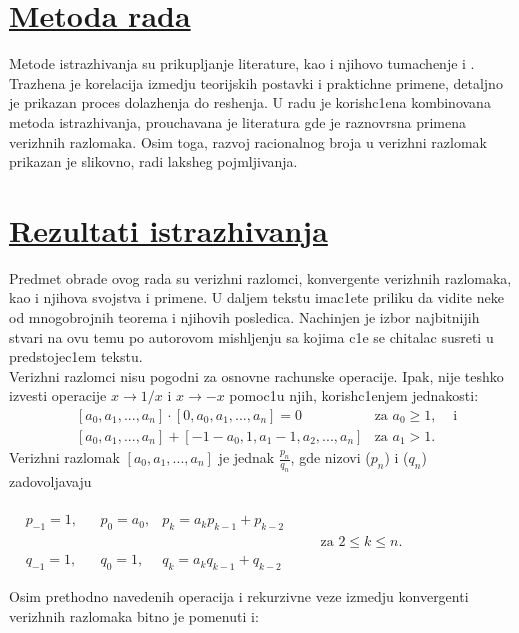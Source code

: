 \documentclass{article}
\begin{document}
\begin{multicols}{2}
\section*{\underline{Metoda rada}}
Metode istrazhivanja su \text prikupljanje literature, kao i njihovo tumachenje i .
Trazhena je \text korelacija izmedju teorijskih postavki i \text praktichne
primene, detaljno je prikazan \text proces dolazhenja do reshenja. U radu je
korish$ $c1ena kombinovana metoda \text istrazhivanja, prouchavana je
literatura gde je raznovrsna \text primena verizhnih razlomaka. Osim toga,  razvoj racionalnog broja u verizhni razlomak prikazan je  slikovno, radi laksheg pojmljivanja.
\noindent

\section*{\underline{Rezultati istrazhivanja}}
Predmet obrade ovog rada su verizhni razlomci, konvergente verizhnih razlomaka, kao i njihova \text svojstva i primene. U daljem tekstu imac1ete \text priliku da vidite neke od mnogobrojnih teorema i njihovih posledica. Nachinjen je izbor najbitnijih stvari na ovu temu po autorovom mishljenju sa \text kojima c1e se chitalac susreti u predstojec1em tekstu.\columnbreak\\
Verizhni razlomci nisu pogodni za osnovne rachunske operacije. Ipak, nije teshko izvesti \text operacije $x \to 1/x$ i $x \to -x$ pomoc1u njih, \text korish{}c1enjem jednakosti:
\begin{align*}
    &[a_0,a_1,...,a_n] \cdot [0,a_0,a_1,...,a_n]=0 &\text{za } a_0\geq 1,& \text{ i}\\
    &[a_0,a_1,...,a_n] + [-1-a_0,1,a_1-1,a_2,...,a_n] &\text{za } a_1>1.&
\end{align*}
Verizhni razlomak $[a_0, a_1, . . . , a_n]$ je jednak $\frac{p_n}{q_n}$, gde \text nizovi ($p_n$) i ($q_n$) zadovoljavaju
\begin{center}
$\begin{aligned}\\[-10mm]
    &p_{-1}=1,& &p_0=a_0, &p_k=a_kp_{k-1}+p_{k-2}&\\[-3mm]
    &&&&&&\quad\text{za } 2\leq k\leq n.\\[-3mm]
    &q_{-1}=1,& &q_0=1, &q_k=a_kq_{k-1}+q_{k-2}&
\end{aligned}$
\end{center}
Osim prethodno navedenih operacija i rekurzivne veze izmedju konvergenti verizhnih razlomaka bitno je pomenuti i:\\

\end{multicols}
\end{document}
